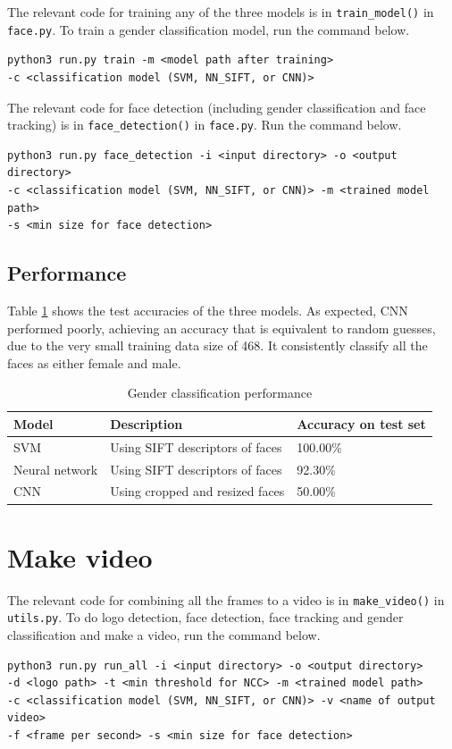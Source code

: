 \documentclass{article}
\begin{document}
\newpage
The relevant code for training any of the three models is in \texttt{train\_model()} in \texttt{face.py}. To train a gender classification model, run the command below.
\begin{verbatim}
python3 run.py train -m <model path after training> 
-c <classification model (SVM, NN_SIFT, or CNN)>
\end{verbatim}

The relevant code for face detection (including gender classification and face tracking) is in \texttt{face\_detection()} in \texttt{face.py}. Run the command below.
\begin{verbatim}
python3 run.py face_detection -i <input directory> -o <output directory>
-c <classification model (SVM, NN_SIFT, or CNN)> -m <trained model path>
-s <min size for face detection> 
\end{verbatim}

\subsection*{Performance}
Table \ref{tab:gender_classification} shows the test accuracies of the three models. As expected, CNN performed poorly, achieving an accuracy that is equivalent to random guesses, due to the very small training data size of 468. It consistently classify all the faces as either female and male.

\begin{table}[h]
 \caption{Gender classification performance}
  \centering
  \begin{tabular}{lll}
    \toprule
    Model		& Description														& Accuracy on test set \\
    \midrule
    SVM							& 	Using SIFT descriptors of faces						& 100.00\% \\
    Neural network		& Using SIFT descriptors of faces							& 92.30\% \\
    CNN							&	Using cropped and resized faces						& 50.00\% \\
    \bottomrule
  \end{tabular}
  \label{tab:gender_classification}
\end{table}

\section{Make video}
The relevant code for combining all the frames to a video is in \texttt{make\_video()} in \texttt{utils.py}. To do logo detection, face detection, face tracking and gender classification and make a video, run the command below.
\begin{verbatim}
python3 run.py run_all -i <input directory> -o <output directory>
-d <logo path> -t <min threshold for NCC> -m <trained model path>
-c <classification model (SVM, NN_SIFT, or CNN)> -v <name of output video>
-f <frame per second> -s <min size for face detection>
\end{verbatim}
\end{document}
